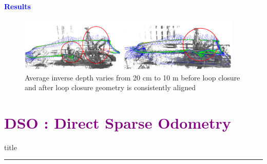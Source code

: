 \documentclass[aspectratio=169]{beamer}
\begin{document}

\begin{frame}{\textcolor{blue}{\textbf{Results}}}
	\vspace{-0.8cm}
\begin{figure}
	\centering
	\includegraphics[width=0.95\textwidth]{pics/loop_closure_lsd.png}
	\caption{Average inverse depth varies from 20 cm to 10 m before loop closure and after loop closure geometry is consistently aligned}
\end{figure}

\end{frame}


\section{\textbf{\textcolor{purple}{DSO : Direct Sparse Odometry}}}
		\begin{frame}[plain]
				\vfill
			\centering
			\begin{beamercolorbox}[sep=8pt,center,shadow=true,rounded=true]{title}
				\insertsectionhead\par%
				\color{oxfordblue}\noindent\rule{10cm}{1pt}
			\end{beamercolorbox}
			\vfill

	\end{frame}
\end{document}

